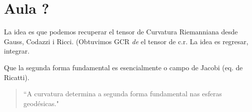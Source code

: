 \section{Aula ?}

\begin{remark}\leavevmode
La idea es que podemos recuperar el tensor de Curvatura Riemanniana desde Gauss, Codazzi i Ricci. (Obtuvimos GCR \textit{de} el tensor de c.r. La idea es regresar, integrar.
\end{remark}


\begin{remark}\leavevmode
Que la segunda forma fundamental es esencialmente o campo de Jacobi (eq. de Ricatti).
\end{remark}

\begin{quotation}
	``A curvatura determina a segunda forma fundamental nas esferas geodésicas."
\end{quotation}


\clearpage
